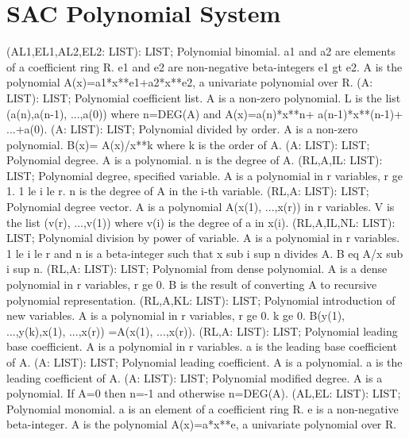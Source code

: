 \section{ SAC Polynomial System  } 
 (AL1,EL1,AL2,EL2: LIST): LIST; \eproc
\bcom Polynomial binomial. a1 and a2 are elements of a coefficient ring
R.  e1 and e2 are non-negative beta-integers e1 gt e2.  A is the
polynomial A(x)=a1*x**e1+a2*x**e2, a univariate polynomial
over R. \ecom 
{} (A: LIST): LIST; \eproc
\bcom Polynomial coefficient list. A is a non-zero polynomial. L is the
list (a(n),a(n-1), ...,a(0)) where n=DEG(A) and A(x)=a(n)*x**n+
a(n-1)*x**(n-1)+ ...+a(0). \ecom 
{} (A: LIST): LIST; \eproc
\bcom Polynomial divided by order. A is a non-zero polynomial. B(x)=
A(x)/x**k where k is the order of A. \ecom 
{} (A: LIST): LIST; \eproc
\bcom Polynomial degree. A is a polynomial. n is the degree of A. \ecom 
{} (RL,A,IL: LIST): LIST; \eproc
\bcom Polynomial degree, specified variable. A is a polynomial in r
variables, r ge 1.  1 le i le r.  n is the degree of A in the i-th
variable. \ecom 
{} (RL,A: LIST): LIST; \eproc
\bcom Polynomial degree vector. A is a polynomial A(x(1), ...,x(r)) in
r variables.  V is the list (v(r), ...,v(1)) where v(i) is the
degree of a in x(i). \ecom 
{} (RL,A,IL,NL: LIST): LIST; \eproc
\bcom Polynomial division by power of variable. A is a polynomial in
r variables.  1 le i le r and n is a beta-integer such that
x sub i sup n divides A. B eq A/x sub i sup n. \ecom 
{} (RL,A: LIST): LIST; \eproc
\bcom Polynomial from dense polynomial. A is a dense polynomial in
r variables, r ge 0.  B is the result of converting A to recursive
polynomial representation. \ecom 
{} (RL,A,KL: LIST): LIST; \eproc
\bcom Polynomial introduction of new variables. A is a polynomial in r
variables, r ge 0.  k ge 0.  B(y(1), ...,y(k),x(1), ...,x(r))
=A(x(1), ...,x(r)). \ecom 
{} (RL,A: LIST): LIST; \eproc
\bcom Polynomial leading base coefficient. A is a polynomial in r
variables. a is the leading base coefficient of A. \ecom 
{} (A: LIST): LIST; \eproc
\bcom Polynomial leading coefficient. A is a polynomial. a is the
leading coefficient of A. \ecom 
{} (A: LIST): LIST; \eproc
\bcom Polynomial modified degree. A is a polynomial. If A=0 then n=-1
and otherwise n=DEG(A). \ecom 
{} (AL,EL: LIST): LIST; \eproc
\bcom Polynomial monomial. a is an element of a coefficient ring R.
e is a non-negative beta-integer.  A is the polynomial
A(x)=a*x**e, a univariate polynomial over R. \ecom 
